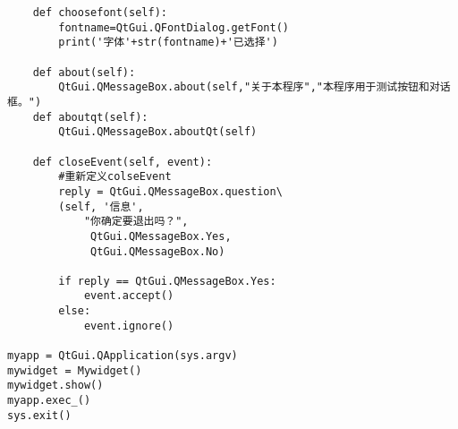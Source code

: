 \documentclass[12pt,oneside]{book}
\begin{document}
\begin{common-format}
\begin{Verbatim}
    def choosefont(self):
        fontname=QtGui.QFontDialog.getFont()
        print('字体'+str(fontname)+'已选择')

    def about(self):
        QtGui.QMessageBox.about(self,"关于本程序","本程序用于测试按钮和对话框。")
    def aboutqt(self):
        QtGui.QMessageBox.aboutQt(self)

    def closeEvent(self, event):
        #重新定义colseEvent
        reply = QtGui.QMessageBox.question\
        (self, '信息',
            "你确定要退出吗？",
             QtGui.QMessageBox.Yes,
             QtGui.QMessageBox.No)

        if reply == QtGui.QMessageBox.Yes:
            event.accept()
        else:
            event.ignore()

myapp = QtGui.QApplication(sys.argv)
mywidget = Mywidget()
mywidget.show()
myapp.exec_()
sys.exit()
\end{Verbatim}






\end{common-format}
\end{document}

